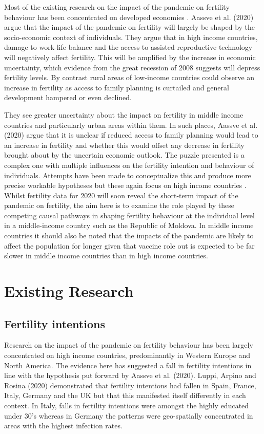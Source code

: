 \documentclass[10pt,letterpaper]{article}
\begin{document}
Most of the existing research on the impact of the pandemic on fertility behaviour has been concentrated on developed economies \cite{luppi2020impact}. Aassve et al. (2020) argue that the impact of the pandemic on fertility will largely be shaped by the socio-economic context of individuals. They argue that in high income countries, damage to work-life balance and the access to assisted reproductive technology will negatively affect fertility. This will be amplified by the increase in economic uncertainty, which evidence from the great recession of 2008 suggests will depress fertility levels. By contrast rural areas of low-income countries could observe an increase in fertility as access to family planning is curtailed and general development hampered or even declined\cite{aassve2020covid}.

They see greater uncertainty about the impact on fertility in middle income countries and particularly urban areas within them. In such places, Aassve et al. (2020) argue that it is unclear if reduced access to family planning would lead to an increase in fertility and whether this would offset any decrease in fertility brought about by the uncertain economic outlook. The puzzle presented is a complex one with multiple influences on the fertility intention and behaviour of individuals. Attempts have been made to conceptualize this and produce more precise workable hypotheses but these again focus on high income countries \cite{voicu2020fertility}. Whilst fertility data for 2020 will soon reveal the short-term impact of the pandemic on fertility, the aim here is to examine the role played by these competing causal pathways in shaping fertility behaviour at the individual level in a middle-income country such as the Republic of Moldova. In middle income countries it should also be noted that the impacts of the pandemic are likely to affect the population for longer given that vaccine role out is expected to be far slower in middle income countries than in high income countries.

\section*{Existing Research} \label{sec:existing}

\subsection*{Fertility intentions}

Research on the impact of the pandemic on fertility behaviour has been largely concentrated on high income countries, predominantly in Western Europe and North America. The evidence here has suggested a fall in fertility intentions in line with the hypothesis put forward by Aassve et al. (2020). Luppi, Arpino and Rosina (2020) demonstrated that fertility intentions had fallen in Spain, France, Italy, Germany and the UK but that this manifested itself differently in each context. In Italy, falls in fertility intentions were amongst the highly educated under 30’s whereas in Germany the patterns were geo-spatially concentrated in areas with the highest infection rates.
\end{document}
